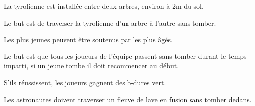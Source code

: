 \documentclass{grand-jeu}
\begin{document}
\begin{liste-materiel}
\end{liste-materiel}

\begin{regles}
La tyrolienne est installée entre deux arbres, environ à 2m du sol. 

Le but est de traverser la tyrolienne d'un arbre à l'autre sans tomber. 

Les plus jeunes peuvent être soutenus par les plus âgés. 

Le but est que tous les joueurs de l'équipe passent sans tomber durant le temps imparti, si un jeune tombe il doit recommencer au début.

S’ils réussissent, les joueurs gagnent des b-dures vert. 
\end{regles}

\begin{imaginaire}
Les astronautes doivent traverser un fleuve de lave en fusion sans tomber dedans. 
\end{imaginaire}

\begin{moments-stop}
\end{moments-stop}
\end{document}
